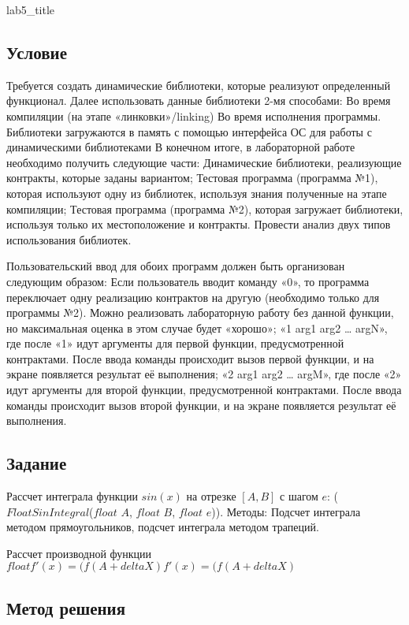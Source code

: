 \documentclass[12pt]{article}
\begin{document}
	
	{lab5_title}
	
	\subsection*{Условие}
	
	Требуется создать динамические библиотеки, которые реализуют определенный функционал. 
	Далее использовать данные библиотеки 2-мя способами:
	Во время компиляции (на этапе «линковки»/linking)
	Во время исполнения программы. Библиотеки загружаются в память с помощью 
	интерфейса ОС для работы с динамическими библиотеками
	В конечном итоге, в лабораторной работе необходимо получить следующие части:
	Динамические библиотеки, реализующие контракты, которые заданы вариантом;
	Тестовая программа (программа №1), которая используют одну из библиотек, используя 
	знания полученные на этапе компиляции;
	Тестовая программа (программа №2), которая загружает библиотеки, используя только их 
	местоположение и контракты.
	Провести анализ двух типов использования библиотек.
	
	Пользовательский ввод для обоих программ должен быть организован следующим образом:
	Если пользователь вводит команду «0», то программа переключает одну реализацию 
	контрактов на другую (необходимо только для программы №2). Можно реализовать 
	лабораторную работу без данной функции, но максимальная оценка в этом случае будет 
	«хорошо»;
	«1 arg1 arg2 … argN», где после «1» идут аргументы для первой функции, предусмотренной 
	контрактами. После ввода команды происходит вызов первой функции, и на экране 
	появляется результат её выполнения;
	«2 arg1 arg2 … argM», где после «2» идут аргументы для второй функции, 
	предусмотренной контрактами. После ввода команды происходит вызов второй функции, 
	и на экране появляется результат её выполнения.
	
	\subsection*{Задание}
	
	Рассчет интеграла функции $sin(x)$ на отрезке $[A, B]$ с шагом $e$: ($Float SinIntegral$($float$ $A$, $float$ $B$, $float$ $e$)). Методы: Подсчет интеграла методом прямоугольников, подсчет интеграла методом трапеций.
	
	Рассчет производной функции	$float f'(x) = (f(A + deltaX) 	f'(x) = (f(A + deltaX)$
	
	\subsection*{Метод решения}
	
\end{document}
